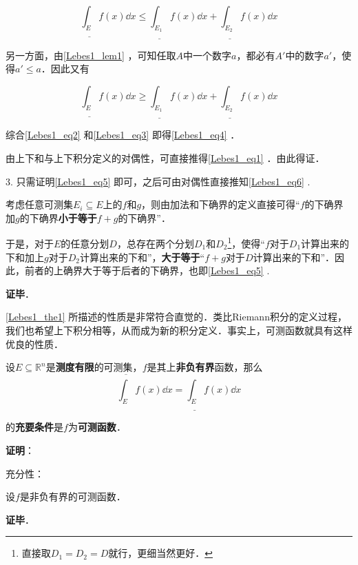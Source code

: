  \begin{equation}\label{Lebes1_eq2}
  \underline{\int_E} f(x) \dd x \leq \underline{\int_{E_1}} f(x) \dd x+\underline{\int_{E_2}} f(x) \dd x
  \end{equation}

另一方面，由\autoref{Lebes1_lem1} ，可知任取$A$中一个数字$a$，都必有$A'$中的数字$a'$，使得$a'\leq a$．因此又有

\begin{equation}\label{Lebes1_eq3}
\underline{\int_E} f(x) \dd x \geq \underline{\int_{E_1}} f(x) \dd x+\underline{\int_{E_2}} f(x) \dd x
\end{equation}

综合\autoref{Lebes1_eq2} 和\autoref{Lebes1_eq3} 即得\autoref{Lebes1_eq4} ．

由上下和与上下积分定义的对偶性，可直接推得\autoref{Lebes1_eq1} ．由此得证．

3. 只需证明\autoref{Lebes1_eq5} 即可，之后可由对偶性直接推知\autoref{Lebes1_eq6} .

考虑任意可测集$E_i\subseteq E$上的$f$和$g$，则由加法和下确界的定义直接可得“$f$的下确界加$g$的下确界\textbf{小于等于}$f+g$的下确界”．

于是，对于$E$的任意分划$D$，总存在两个分划$D_1$和$D_2$\footnote{直接取$D_1=D_2=D$就行，更细当然更好．}，使得“$f$对于$D_1$计算出来的下和加上$g$对于$D_2$计算出来的下和”，\textbf{大于等于}“$f+g$对于$D$计算出来的下和”．因此，前者的上确界大于等于后者的下确界，也即\autoref{Lebes1_eq5} .

\textbf{证毕}．


\autoref{Lebes1_the1} 所描述的性质是非常符合直觉的．类比Riemann积分的定义过程，我们也希望上下积分相等，从而成为新的积分定义．事实上，可测函数就具有这样优良的性质．

\begin{theorem}{}
设$E\subseteq \mathbb{R}^n$是\textbf{测度有限}的可测集，$f$是其上\textbf{非负有界}函数，那么
\begin{equation}
\overline{\int_E} f(x) \dd x = \underline{\int_E} f(x) \dd x
\end{equation}
\end{theorem}
的\textbf{充要条件}是$f$为\textbf{可测函数}．


\textbf{证明}：

充分性：

设$f$是非负有界的可测函数．

\textbf{证毕}．












